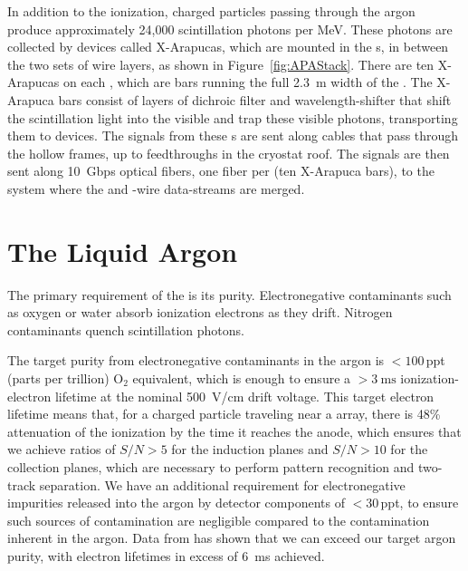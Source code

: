 In addition to the ionization, charged particles passing through the argon produce approximately 24,000 scintillation photons per \si{\mega\electronvolt}. These photons are collected by devices called X-Arapucas, which are mounted in the s, in between the two sets of wire layers, as shown in Figure~\ref{fig:APAStack}. There are ten X-Arapucas on each , which are bars running the full \SI{2.3}{\meter} width of the . The X-Arapuca bars consist of layers of dichroic filter and wavelength-shifter that shift the  scintillation light into the visible and trap these visible photons, transporting them to  devices. The signals from these s are sent along cables that pass through the hollow  frames, up to feedthroughs in the cryostat roof. The signals are then sent along \SI{10}{Gbps} optical fibers, one fiber per  (ten X-Arapuca bars), to the  system where the  and -wire data-streams are merged.

\section{The Liquid Argon}
\label{sec:fdsp-exec-liquidargon}

The primary requirement of the  is its purity. Electronegative contaminants such as oxygen or water absorb ionization electrons as they drift. Nitrogen contaminants quench scintillation photons.

The target purity from electronegative contaminants in the argon is $<\!\!100$\,ppt (parts per trillion) O$_{2}$ equivalent, which is enough to ensure a $>\!\!\SI{3}{\milli\second}$ ionization-electron lifetime at the nominal \SI{500}{\volt/\centi\meter} drift voltage. This target electron lifetime means that, for a charged particle traveling near a  array, there is 48\% attenuation of the ionization by the time it reaches the anode, which ensures that we achieve  ratios of $S/N>5$ for the induction planes and $S/N>10$ for the collection planes, which are necessary to perform pattern recognition and two-track separation. We have an additional requirement for electronegative impurities released into the argon by detector components of $<\!30$\,ppt, to ensure such sources of contamination are negligible compared to the contamination inherent in the argon. Data from  has shown that we can exceed our target argon purity, with electron lifetimes in excess of \SI{6}{\milli\second} achieved.

